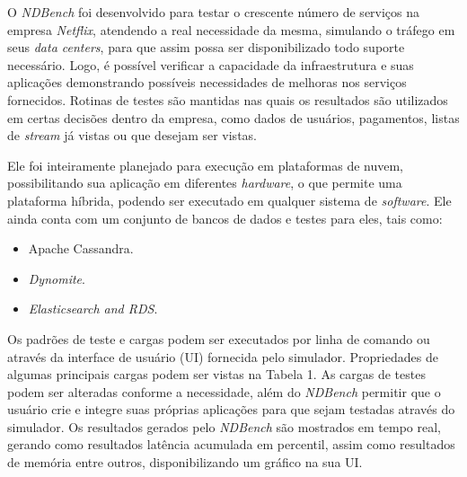 \documentclass[12pt,english,brazil]{article}
\begin{document}
O \textit{NDBench} foi desenvolvido para testar o crescente número de serviços na empresa \textit{Netflix}, atendendo a real necessidade da mesma, simulando o tráfego em seus \textit{data centers}, para que assim possa ser disponibilizado todo suporte necessário. Logo, é possível verificar a capacidade da infraestrutura e suas aplicações demonstrando possíveis necessidades de melhoras nos serviços fornecidos. Rotinas de testes são mantidas nas quais os resultados são utilizados em certas decisões dentro da empresa, como dados de usuários, pagamentos, listas de \textit{stream} já vistas ou que desejam ser vistas.

Ele foi inteiramente planejado para execução em plataformas de nuvem, possibilitando sua aplicação em diferentes \textit{hardware}, o que permite uma plataforma híbrida, podendo ser executado em qualquer sistema de \textit{software}. Ele ainda conta com um conjunto de bancos de dados e testes para eles, tais como:
\begin{itemize}
    \item Apache Cassandra.
    \item \textit{Dynomite}.
    \item \textit{Elasticsearch and RDS}.
\end{itemize}

Os padrões de teste e cargas podem ser executados por linha de comando ou através da interface de usuário (UI) fornecida pelo simulador. Propriedades de algumas principais cargas podem ser vistas na Tabela 1. As cargas de testes podem ser alteradas conforme a necessidade, além do \textit{NDBench} permitir que o usuário crie e integre suas próprias aplicações para que sejam testadas através do simulador. Os resultados gerados pelo \textit{NDBench} são mostrados em tempo real, gerando como resultados latência acumulada em percentil, assim como resultados de memória entre outros, disponibilizando um gráfico na sua UI.
        
\end{document}
